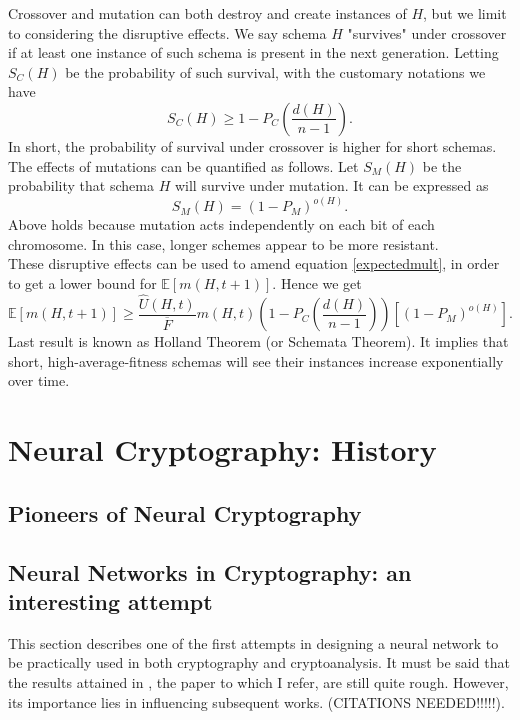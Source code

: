 \documentclass[%
    corpo=11pt,
    twoside,
    stile=classica,
    oldstyle,
    autoretitolo,
    tipotesi=magistrale,
    greek,
    evenboxes,
    english
]{toptesi}
\begin{document}
Crossover and mutation can both destroy and create instances of $H$, but we limit to considering the disruptive effects. We say schema $H$ "survives" under crossover if at least one instance of such schema is present in the next generation. Letting $S_C(H)$ be the probability of such survival, with the customary notations we have
\begin{equation}
S_C(H) \geq 1 - P_C\left(\frac{d(H)}{n-1} \right).
\end{equation}
In short, the probability of survival under crossover is higher for short schemas. \\
The effects of mutations can be quantified as follows. Let $S_M(H)$ be the probability that schema $H$ will survive under mutation. It can be expressed as
\begin{equation}
S_M(H) = (1-P_M)^{o(H)}.
\end{equation}
Above holds because mutation acts independently on each bit of each chromosome. In this case, longer schemes appear to be more resistant. \\
These disruptive effects can be used to amend equation \ref{expectedmult}, in order to get a lower bound for $\mathbb{E}\left[m(H, t + 1) \right]$. Hence we get
\begin{equation}
\mathbb{E}\left[m(H, t + 1) \right] \geq \frac{\hat{U}(H,t)}{\overline{F}}m(H,t)\left( 1 - P_C\left(\frac{d(H)}{n-1} \right)\right)\left[ (1-P_M)^{o(H)}\right].
\end{equation}
Last result is known as Holland Theorem (or Schemata Theorem). It implies that short, high-average-fitness schemas will see their instances increase exponentially over time.

\chapter{Neural Cryptography: History}
\section{Pioneers of Neural Cryptography}
\newpage

\section{Neural Networks in Cryptography: an interesting attempt}
This section describes one of the first attempts in designing a neural network to be practically used in both cryptography and cryptoanalysis. It must be said that the results attained in \cite{volna}, the paper to which I refer, are still quite rough. However, its importance lies in influencing subsequent works. (CITATIONS NEEDED!!!!!).
\end{document}
